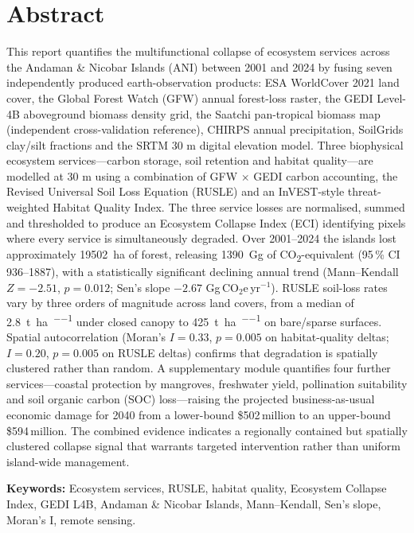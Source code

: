 \documentclass[12pt,a4paper]{article}
\begin{document}
\section*{Abstract}
This report quantifies the multifunctional collapse of ecosystem services
across the Andaman \& Nicobar Islands (ANI) between 2001 and 2024 by
fusing seven independently produced earth-observation products: ESA
WorldCover 2021 land cover, the Global Forest Watch (GFW) annual
forest-loss raster, the GEDI Level-4B aboveground biomass density grid,
the Saatchi pan-tropical biomass map (independent cross-validation
reference), CHIRPS annual precipitation, SoilGrids clay/silt fractions
and the SRTM 30 m digital elevation model. Three biophysical ecosystem
services---carbon storage, soil retention and habitat quality---are
modelled at 30 m using a combination of GFW $\times$ GEDI carbon
accounting, the Revised Universal Soil Loss Equation (RUSLE) and an
InVEST-style threat-weighted Habitat Quality Index. The three service
losses are normalised, summed and thresholded to produce an Ecosystem
Collapse Index (ECI) identifying pixels where every service is
simultaneously degraded. Over 2001--2024 the islands lost approximately
\SI{19502}{\hectare} of forest, releasing \SI{1390}{\giga\gram} of
CO\textsubscript{2}-equivalent (95\,\% CI 936--1887), with a
statistically significant declining annual trend (Mann--Kendall
$Z=-2.51$, $p=0.012$; Sen's slope $-2.67$ Gg\,CO$_2$e\,yr$^{-1}$). RUSLE
soil-loss rates vary by three orders of magnitude across land covers,
from a median of \SI{2.8}{\tonne\per\hectare\per\year} under closed
canopy to \SI{425}{\tonne\per\hectare\per\year} on bare/sparse surfaces.
Spatial autocorrelation (Moran's $I=0.33$, $p=0.005$ on habitat-quality
deltas; $I=0.20$, $p=0.005$ on RUSLE deltas) confirms that degradation
is spatially clustered rather than random. A supplementary module
quantifies four further services---coastal protection by mangroves,
freshwater yield, pollination suitability and soil organic carbon (SOC)
loss---raising the projected business-as-usual economic damage for 2040
from a lower-bound \$502\,million to an upper-bound \$594\,million. The
combined evidence indicates a regionally contained but spatially
clustered collapse signal that warrants targeted intervention rather
than uniform island-wide management.

\bigskip\noindent\textbf{Keywords:} Ecosystem services, RUSLE, habitat
quality, Ecosystem Collapse Index, GEDI L4B, Andaman \& Nicobar Islands,
Mann--Kendall, Sen's slope, Moran's I, remote sensing.
\end{document}
